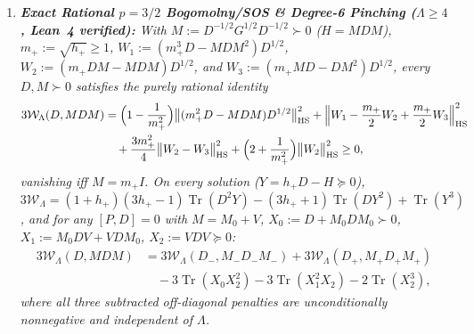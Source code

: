 \documentclass[10pt,letterpaper]{article}
\newcommand{\Tr}{\operatorname{Tr}}
\newcommand{\HS}{\mathrm{HS}}
\begin{document}
\begin{tcolorbox}[mathbox]
\begin{enumerate}[label=(\alph*),leftmargin=1.8em,itemsep=2pt,topsep=2pt]
  \[
    4\mathcal{W}_\Lambda(D, H) = \bigl\|H^2 + \alpha(DH + HD) - \beta D^2\bigr\|_{\HS}^2 + \gamma\bigl\|[D, H]\bigr\|_{\HS}^2 + c\bigl\|H^{1/2}(H - h_+ D)D^{1/2}\bigr\|_{\HS}^2 \ge 0.
  \]
  \emph{On every solution with $Y := h_+ D - H \succeq 0$ and any projection $P$ commuting with $D$ ($H = H_0 + V$, $V = \bigl(\begin{smallmatrix} 0 & B \\ B^* & 0 \end{smallmatrix}\bigr)$):}
  \[
    4\mathcal{W}_\Lambda(D, H) = 2(1+h_+)\Tr(D Y^3) - \Tr(Y^4) = \Tr\Bigl(Y^{3/2}\bigl((2+h_+)D + H\bigr)Y^{3/2}\Bigr),
  \]
  \[
    4\mathcal{W}_\Lambda(D, H) = 4\mathcal{W}_\Lambda(D_-, H_-) + 4\mathcal{W}_\Lambda(D_+, H_+) - 2\Tr\bigl((B^* B)^2\bigr).
  \]
  \item \emph{\textbf{Exact Rational $p = 3/2$ Bogomolny/SOS \& Degree-6 Pinching ($\Lambda \ge 4$, Lean~4 verified):} With $M := D^{-1/2} G^{1/2} D^{-1/2} \succ 0$ ($H = M D M$), $m_+ := \sqrt{h_+} \ge 1$, $W_1 := (m_+^3 D - M D M^2)D^{1/2}$, $W_2 := (m_+ D M - M D M)D^{1/2}$, and $W_3 := (m_+ M D - D M^2)D^{1/2}$, every $D, M \succ 0$ satisfies the purely rational identity}
  \begin{align*}
    3\mathcal{W}_\Lambda(D, M D M)
    &= \Bigl(1 - \frac{1}{m_+^2}\Bigr)\bigl\|(m_+^2 D - M D M)D^{1/2}\bigr\|_{\HS}^2
       + \Bigl\|W_1 - \frac{m_+}{2}W_2 + \frac{m_+}{2}W_3\Bigr\|_{\HS}^2 \\
    &\quad + \frac{3m_+^2}{4}\bigl\|W_2 - W_3\bigr\|_{\HS}^2
       + \Bigl(2 + \frac{1}{m_+^2}\Bigr)\bigl\|W_2\bigr\|_{\HS}^2 \ge 0,
  \end{align*}
  \emph{vanishing iff $M = m_+ I$. On every solution ($Y = h_+ D - H \succeq 0$), $3\mathcal{W}_\Lambda = (1+h_+)(3h_+-1)\Tr(D^2 Y) - (3h_++1)\Tr(D Y^2) + \Tr(Y^3)$, and for any $[P, D] = 0$ with $M = M_0 + V$, $X_0 := D + M_0 D M_0 \succ 0$, $X_1 := M_0 D V + V D M_0$, $X_2 := V D V \succeq 0$:}
  \begin{align*}
    3\mathcal{W}_\Lambda(D, M D M)
    &= 3\mathcal{W}_\Lambda(D_-, M_- D_- M_-) + 3\mathcal{W}_\Lambda(D_+, M_+ D_+ M_+) \\
    &\quad - 3\Tr(X_0 X_2^2) - 3\Tr(X_1^2 X_2) - 2\Tr(X_2^3),
  \end{align*}
  \emph{where all three subtracted off-diagonal penalties are unconditionally nonnegative and independent of $\Lambda$.}
\end{enumerate}
\end{tcolorbox}
\end{document}
